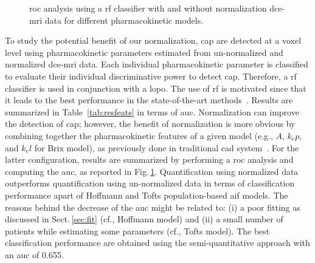 \begin{figure}
  \centering
  \hspace*{\fill}
   \hfill
  \hspace*{\fill}
  \caption{\acs*{roc} analysis using a \acs*{rf} classifier with and without normalization \ac{dce}-\ac{mri} data for different pharmacokinetic models.}
  \label{fig:normpharmarf}
\end{figure}

To study the potential benefit of our normalization, \ac{cap} are detected at a voxel level using pharmacokinetic parameters estimated from un-normalized and normalized \ac{dce}-\ac{mri} data.
Each individual pharmacokinetic parameter is classified to evaluate their individual discriminative power to detect \ac{cap}.
Therefore, a \ac{rf} classifier is used in conjunction with a \ac{lopo}.
The use of \ac{rf} is motivated since that it leads to the best performance in the state-of-the-art methods~\citep{litjens2014computer,lemaitre2015computer}.
Results are summarized in Table~\ref{tab:resfeats} in terms of \ac{auc}.
Normalization can improve the detection of \ac{cap}; however, the benefit of normalization is more obvious by combining together the pharmacokinetic features of a given model (e.g., $A$, $k_ep$, and $k_el$ for Brix model), as previously done in traditional \ac{cad} system~\citep{lemaitre2015computer}.
For the latter configuration, results are summarized by performing a \ac{roc} analysis and computing the \ac{auc}, as reported in Fig.\,\ref{fig:normpharmarf}.
Quantification using normalized data outperforms quantification using un-normalized data in terms of classification performance apart of Hoffmann and Tofts population-based \ac{aif} models.
The reasons behind the decrease of the \ac{auc} might be related to: (i) a poor fitting as discussed in Sect.\,\ref{sec:fit} (cf., Hoffmann model) and (ii) a small number of patients while estimating some parameters (cf., Tofts model).
The best classification performance are obtained using the semi-quantitative approach with an \ac{auc} of 0.655.

